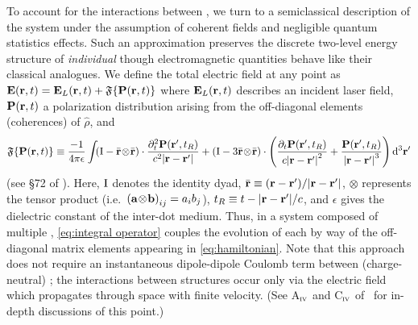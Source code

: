 To account for the interactions between \qds{}, we turn to a semiclassical description of the system under the assumption of coherent fields and negligible quantum  statistics effects.
Such an approximation preserves the discrete two-level energy structure of \emph{individual} \qds{} though electromagnetic quantities behave like their classical analogues.
We define the total electric field at any point as $\vb{E}(\vb{r}, t) = \vb{E}_L(\vb{r}, t) + \mathfrak{F}\{ \vb{P}(\vb{r}, t) \}$
where $\vb{E}_L(\vb{r}, t)$ describes an incident laser field, $\vb{P}(\vb{r}, t)$ a polarization distribution arising from  the off-diagonal elements (coherences) of $\hat{\rho}$, and
\begin{equation}
    \mathfrak{F}\{\vb{P}(\vb{r}, t)\} \equiv
    \frac{-1}{4\pi \epsilon} \int_{}
      \left(\mathrm{I} -  \bar{\vb{r}} \! \otimes \! \bar{\vb{r}} \right) \cdot \frac{\partial_t^2 \vb{P}(\vb{r}', t_R)}{c^2 \abs{\vb{r}-\vb{r}'}} + 
      \left(\mathrm{I} - 3\bar{\vb{r}} \! \otimes \! \bar{\vb{r}} \right) \cdot \qty(
        \frac{\partial_t   \vb{P}(\vb{r}', t_R)}{c \abs{\vb{r}-\vb{r}'}^2} +
        \frac{             \vb{P}(\vb{r}', t_R)}{  \abs{\vb{r}-\vb{r}'}^3}
      ) \dd[3]{\vb{r}'}
  \label{eq:integral operator}
\end{equation}
(see \S 72 of \cite{Landau2013}).
Here, $\mathrm{I}$ denotes the identity dyad, $\bar{\vb{r}} \equiv \qty(\vb{r} - \vb{r}')/\abs{\vb{r} - \vb{r}'}$, $\otimes$ represents the tensor product (i.e.\ $\qty(\vb{a} \! \otimes \! \vb{b})_{ij} = a_i b_j$), $t_R \equiv t - \abs{\vb{r} - \vb{r}'}/c$, and $\epsilon$ gives the dielectric constant of the inter-dot medium.
Thus, in a system composed of multiple \qds{}, \cref{eq:integral operator} couples the evolution of each \qd{} by way of the off-diagonal matrix elements appearing in \cref{eq:hamiltonian}.
Note that this approach does not require an instantaneous dipole-dipole Coulomb term between (charge-neutral) \qds{}; the interactions between structures occur only via the electric field which propagates through space with finite velocity.
(See {A}$_{\textsc{iv}}$  and {C}$_{\textsc{iv}}$ of~\cite{Cohen1989} for in-depth discussions of this point.)


